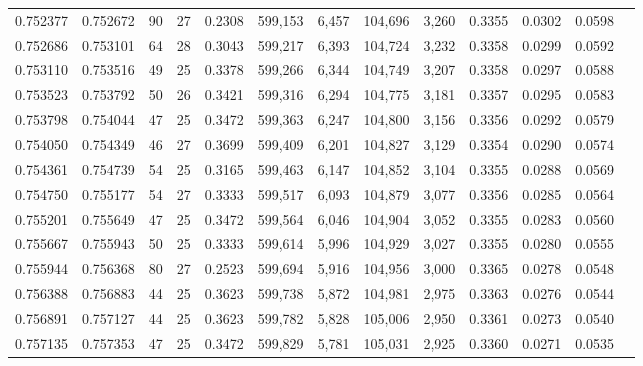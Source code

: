 \begin{tabular}{rrrrrrrrrrrrr}
0.752377 & 0.752672 &  90 &  27 &                                     0.2308 & 599,153 &   6,457 & 104,696 &   3,260 & 0.3355 & 0.0302 & 0.0598 \\
0.752686 & 0.753101 &  64 &  28 &                                     0.3043 & 599,217 &   6,393 & 104,724 &   3,232 & 0.3358 & 0.0299 & 0.0592 \\
0.753110 & 0.753516 &  49 &  25 &                                     0.3378 & 599,266 &   6,344 & 104,749 &   3,207 & 0.3358 & 0.0297 & 0.0588 \\
0.753523 & 0.753792 &  50 &  26 &                                     0.3421 & 599,316 &   6,294 & 104,775 &   3,181 & 0.3357 & 0.0295 & 0.0583 \\
0.753798 & 0.754044 &  47 &  25 &                                     0.3472 & 599,363 &   6,247 & 104,800 &   3,156 & 0.3356 & 0.0292 & 0.0579 \\
0.754050 & 0.754349 &  46 &  27 &                                     0.3699 & 599,409 &   6,201 & 104,827 &   3,129 & 0.3354 & 0.0290 & 0.0574 \\
0.754361 & 0.754739 &  54 &  25 &                                     0.3165 & 599,463 &   6,147 & 104,852 &   3,104 & 0.3355 & 0.0288 & 0.0569 \\
0.754750 & 0.755177 &  54 &  27 &                                     0.3333 & 599,517 &   6,093 & 104,879 &   3,077 & 0.3356 & 0.0285 & 0.0564 \\
0.755201 & 0.755649 &  47 &  25 &                                     0.3472 & 599,564 &   6,046 & 104,904 &   3,052 & 0.3355 & 0.0283 & 0.0560 \\
0.755667 & 0.755943 &  50 &  25 &                                     0.3333 & 599,614 &   5,996 & 104,929 &   3,027 & 0.3355 & 0.0280 & 0.0555 \\
0.755944 & 0.756368 &  80 &  27 &                                     0.2523 & 599,694 &   5,916 & 104,956 &   3,000 & 0.3365 & 0.0278 & 0.0548 \\
0.756388 & 0.756883 &  44 &  25 &                                     0.3623 & 599,738 &   5,872 & 104,981 &   2,975 & 0.3363 & 0.0276 & 0.0544 \\
0.756891 & 0.757127 &  44 &  25 &                                     0.3623 & 599,782 &   5,828 & 105,006 &   2,950 & 0.3361 & 0.0273 & 0.0540 \\
0.757135 & 0.757353 &  47 &  25 &                                     0.3472 & 599,829 &   5,781 & 105,031 &   2,925 & 0.3360 & 0.0271 & 0.0535 \\

\end{tabular}
